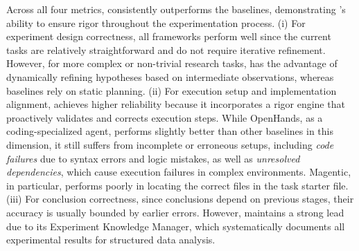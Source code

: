 Across all four metrics, \sys consistently outperforms the baselines, demonstrating \sys’s ability to ensure rigor throughout the experimentation process.
(i) For experiment design correctness, all frameworks perform well since the current tasks are relatively straightforward and do not require iterative refinement. However, for more complex or non-trivial research tasks, \sys has the advantage of dynamically refining hypotheses based on intermediate observations, whereas baselines rely on static planning.
(ii) For execution setup and implementation alignment, \sys achieves higher reliability because it incorporates a rigor engine that proactively validates and corrects execution steps.
While OpenHands, as a coding-specialized agent, performs slightly better than other baselines in this dimension, it still suffers from incomplete or erroneous setups, including \textit{code failures} due to syntax errors and logic mistakes, as well as \textit{unresolved dependencies}, which cause execution failures in complex environments. 
Magentic, in particular, performs poorly in locating the correct files in the task starter file.
(iii) For conclusion correctness, since conclusions depend on previous stages, their accuracy is usually bounded by earlier errors. 
However, \sys maintains a strong lead due to its Experiment Knowledge Manager, which systematically documents all experimental results for structured data analysis.
\fi 



 





